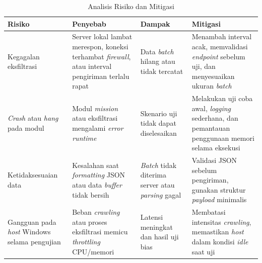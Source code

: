 \begin{table}[H]
\centering
\captionsetup{justification=raggedright,singlelinecheck=false}
\caption{Analisis Risiko dan Mitigasi}
\label{tbl:analisis-risiko-mitigasi}
\begin{tabular}{|p{2.7cm}|p{3.8cm}|p{3.3cm}|p{4.2cm}|}
\hline
\textbf{Risiko} & \textbf{Penyebab} & \textbf{Dampak} & \textbf{Mitigasi} \\
\hline

Kegagalan eksfiltrasi
&
Server lokal lambat merespon, koneksi terhambat \textit{firewall}, atau interval pengiriman terlalu rapat
&
Data \textit{batch} hilang atau tidak tercatat
&
Menambah interval acak, memvalidasi \textit{endpoint} sebelum uji, dan menyesuaikan ukuran \textit{batch}
\\
\hline

\textit{Crash} atau \textit{hang} pada modul
&
Modul \textit{mission} atau eksfiltrasi mengalami \textit{error runtime}
&
Skenario uji tidak dapat diselesaikan
&
Melakukan uji coba awal, \textit{logging} sederhana, dan pemantauan penggunaan memori selama eksekusi
\\
\hline

Ketidaksesuaian data
&
Kesalahan saat \textit{formatting} JSON atau data \textit{buffer} tidak bersih
&
\textit{Batch} tidak diterima server atau \textit{parsing} gagal
&
Validasi JSON sebelum pengiriman, gunakan struktur \textit{payload} minimalis
\\
\hline

Gangguan pada \textit{host} Windows selama pengujian
&
Beban \textit{crawling} atau proses eksfiltrasi memicu \textit{throttling} CPU/memori
&
Latensi meningkat dan hasil uji bias
&
Membatasi intensitas \textit{crawling}, memastikan \textit{host} dalam kondisi \textit{idle} saat uji
\\
\hline

\end{tabular}
\end{table}